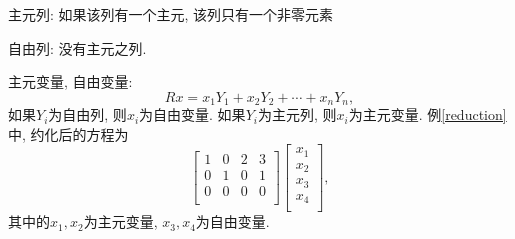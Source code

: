 主元列: 如果该列有一个主元, 该列只有一个非零元素

自由列: 没有主元之列.

主元变量, 自由变量:
\begin{equation}
  Rx = x_1 Y_1 + x_2  Y_2 + \cdots  + x_n Y_n,
\end{equation}
如果$Y_i$为自由列, 则$x_i$为自由变量. 如果$Y_i$为主元列, 则$x_i$为主元变量.
例\ref{reduction}中, 约化后的方程为
\begin{equation}
  \begin{bmatrix}
   1 & 0 & 2 & 3\\
   0 & 1 & 0 & 1\\
   0 & 0 & 0 & 0\\
  \end{bmatrix}
  \begin{bmatrix}
   x_1\\
   x_2\\
   x_3\\
   x_4\\
  \end{bmatrix},
\end{equation}
其中的$x_1,x_2$为主元变量, $x_3, x_4$为自由变量.
